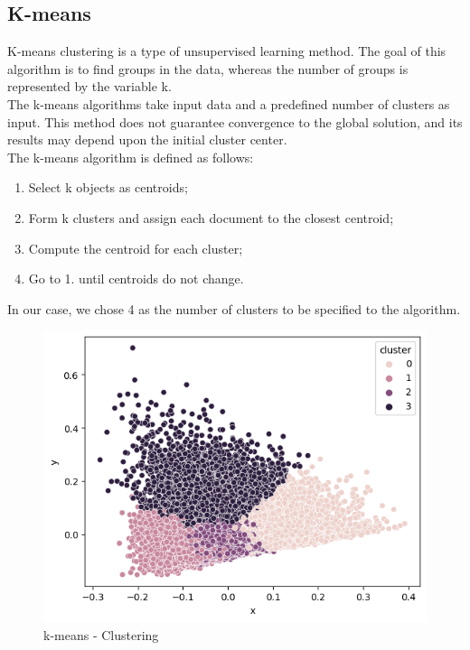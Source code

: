 \documentclass[fleqn,10pt]{SelfArx} %
\begin{document}
\subsection{K-means}
K-means clustering is a type of unsupervised learning method. The goal of this algorithm is to find groups in the data, whereas the number of groups is represented by the variable k.\\
The k-means algorithms take input data and a predefined number of clusters as input. This method does not guarantee convergence to the global solution, and its results may depend upon the initial cluster center.\\
The k-means algorithm is defined as follows:
\begin{enumerate}
	\item Select k objects as centroids;
	\item Form k clusters and assign each document to the closest centroid;
	\item Compute the centroid for each cluster;
	\item Go to 1. until centroids do not change.
\end{enumerate}

In our case, we chose 4 as the number of clusters to be specified to the algorithm.

\begin{figure}[H]
\begin{center}
  \includegraphics[scale=0.5]{./images/k-means.png}
\end{center}
  \caption{k-means - Clustering}
\end{figure}
\end{document}
